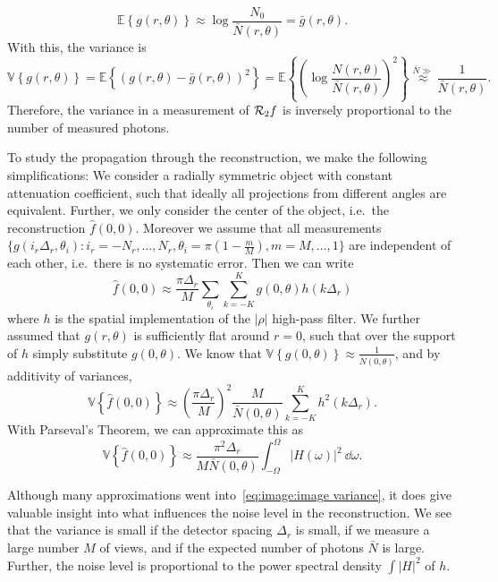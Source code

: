 \documentclass[../ml-ct.tex]{subfiles}
\begin{document}
\begin{equation}
	\mathbb{E}\left\{ g(r, \theta) \right\} \approx \log \frac{N_0}{\bar{N}(r, \theta)} = \bar{g}(r, \theta).
\end{equation}
With this, the variance is
\begin{equation}
	\mathbb{V}\left\{ g(r, \theta) \right\} = \mathbb{E}\left\{ {(g(r, \theta) - \bar{g}(r, \theta))}^2 \right\} = \mathbb{E}\left\{ {\left(\log\frac{N(r, \theta)}{\bar{N}(r, \theta)} \right)}^2\right\} \overset{\bar{N} \gg}{\approx} \frac{1}{\bar{N}(r, \theta)}.
\end{equation}
Therefore, the variance in a measurement of \( \mathcal{R}_2 f \) is inversely proportional to the number of measured photons.

To study the propagation through the reconstruction, we make the following simplifications:
We consider a radially symmetric object with constant attenuation coefficient, such that ideally all projections from different angles are equivalent.
Further, we only consider the center of the object, i.e.\ the reconstruction \( \hat{f}(0, 0) \).
Moreover we assume that all measurements \( \{ g(i_r\Delta_r, \theta_i) \colon i_r = -N_r, \dotsc, N_r, \theta_i = \pi(1 - \frac{m}{M}), m = M, \dotsc, 1 \} \) are independent of each other, i.e.\ there is no systematic error.
Then we can write
\begin{equation}
	\hat{f}(0, 0) \approx \frac{\pi\Delta_r}{M} \sum_{\theta_i} \sum_{k=-K}^{K} g(0, \theta) h(k\Delta_r)
\end{equation}
where \( h \) is the spatial implementation of the \( |\rho| \) high-pass filter.
We further assumed that \( g(r, \theta) \) is sufficiently flat around \( r = 0 \), such that over the support of \( h \) simply substitute \( g(0, \theta) \).
We know that \( \mathbb{V} \left\{ g(0, \theta) \right\} \approx \frac{1}{\bar{N}(0, \theta)} \), and by additivity of variances,
\begin{equation}
	\mathbb{V}\left\{ \hat{f}(0, 0) \right\} \approx {\left( \frac{\pi\Delta_r}{M} \right)}^2 \frac{M}{\bar{N}(0, \theta)} \sum_{k=-K}^{K} h^2(k\Delta_r).
\end{equation}
With Parseval's Theorem, we can approximate this as
\begin{equation}
	\mathbb{V}\left\{ \hat{f}(0, 0) \right\} \approx\frac{\pi^2\Delta_r}{M\bar{N}(0, \theta)} \int_{-\Omega}^{\Omega} {|H(\omega)|}^2\ \dd \omega.
	\label{eq:image:image variance}
\end{equation}

Although many approximations went into~\cref{eq:image:image variance}, it does give valuable insight into what influences the noise level in the reconstruction.
We see that the variance is small if the detector spacing \( \Delta_r \) is small, if we measure a large number \( M \) of views, and if the expected number of photons \( \bar{N} \)  is large.
Further, the noise level is proportional to the power spectral density \( \int |H|^2 \) of \( h \).
\end{document}
